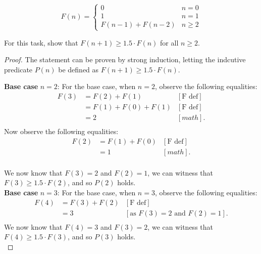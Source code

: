 \documentclass[10pt]{article}
\begin{document}
\begin{enumerate}[label={}]
          $$
              F(n)= \begin{cases}0 & n=0 \\ 1 & n=1 \\ F(n-1)+F(n-2) & n \geq 2\end{cases}
          $$


          For this task, show that $F(n+1) \geq 1.5 \cdot F(n)$ for all $n \geq 2$.

          \begin{proof}
              The statement can be proven by strong induction, letting the indcutive predicate $P(n)$ be defined as $F(n+1) \geq 1.5 \cdot F(n)$.

              \textbf{Base case} $n=2$: For the base case, when $n=2$, observe the following equalities:
              $$
                  \begin{aligned}
                      F(3) & = F(2) + F(1)
                           & {\left[\text {F def}\right] } \\
                           & = F(1) + F(0) + F(1)
                           & {\left[\text {F def}\right] } \\
                           & = 2
                           & {\left[math\right] }.         \\
                  \end{aligned}
              $$
              Now observe the following equalities:
              $$
                  \begin{aligned}
                      F(2) & = F(1) + F(0)
                           & {\left[\text {F def}\right] } \\
                           & = 1
                           & {\left[math\right] }.         \\
                  \end{aligned}
              $$

              We now know that $F(3) = 2$ and $F(2) = 1$, we can witness that $F(3) \geq 1.5 \cdot F(2)$, and so $P(2)$ holds.\\

              \textbf{Base case} $n=3$: For the base case, when $n=3$, observe the following equalities:
              $$
                  \begin{aligned}
                      F(4) & = F(3) + F(2)
                           & {\left[\text {F def}\right] }                        \\
                           & = 3
                           & {\left[\text{as $F(3) = 2$ and $F(2) = 1$}\right] }. \\
                  \end{aligned}
              $$
              We now know that $F(4) = 3$ and $F(3) = 2$, we can witness that $F(4) \geq 1.5 \cdot F(3)$, and so $P(3)$ holds.\\


\end{proof}
\end{enumerate}
\end{document}
